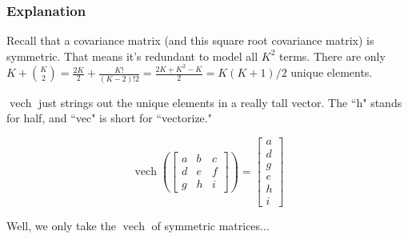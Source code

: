 \documentclass{beamer}
\begin{document}

\begin{frame}
\frametitle{Explanation}

Recall that a covariance matrix (and this square root covariance matrix) is symmetric. That means it's redundant to model all $K^2$ terms. There are only $K + { K \choose 2} = \frac{2K}{2} + \frac{K!}{ (K-2)!2} = \frac{2K + K^2 - K}{2} = K(K+1)/2$ unique elements.
\newline
\pause 

$\operatorname{vech}$ just strings out the unique elements in a really tall vector. The ``h" stands for half, and ``vec" is short for ``vectorize."
\pause

\[
\operatorname{vech}\left( \left[ \begin{array}{ccc} 
a & b & c\\
d & e & f \\
g & h & i
\end{array}\right] \right) 
=
\left[ \begin{array}{c}
a \\
d \\
g \\
e \\
h \\
i
\end{array}\right]
\]
\pause

Well, we only take the $\operatorname{vech}$ of symmetric matrices...
\end{frame}

\end{document}
